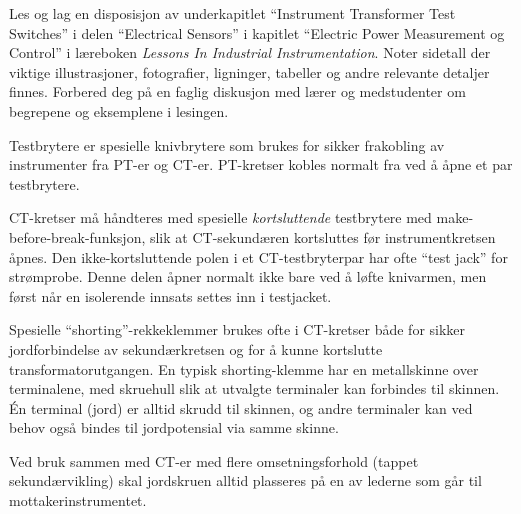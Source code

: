 

Les og lag en disposisjon av underkapitlet ``Instrument Transformer Test Switches'' i delen ``Electrical Sensors'' i kapitlet ``Electric Power Measurement og Control'' i læreboken {\it Lessons In Industrial Instrumentation}. Noter sidetall der viktige illustrasjoner, fotografier, ligninger, tabeller og andre relevante detaljer finnes. Forbered deg på en faglig diskusjon med lærer og medstudenter om begrepene og eksemplene i lesingen.













Testbrytere er spesielle knivbrytere som brukes for sikker frakobling av instrumenter fra PT-er og CT-er. PT-kretser kobles normalt fra ved å åpne et par testbrytere.

\vskip 10pt

CT-kretser må håndteres med spesielle {\it kortsluttende} testbrytere med make-before-break-funksjon, slik at CT-sekundæren kortsluttes før instrumentkretsen åpnes. Den ikke-kortsluttende polen i et CT-testbryterpar har ofte ``test jack'' for strømprobe. Denne delen åpner normalt ikke bare ved å løfte knivarmen, men først når en isolerende innsats settes inn i testjacket.

\vskip 10pt

Spesielle ``shorting''-rekkeklemmer brukes ofte i CT-kretser både for sikker jordforbindelse av sekundærkretsen og for å kunne kortslutte transformatorutgangen. En typisk shorting-klemme har en metallskinne over terminalene, med skruehull slik at utvalgte terminaler kan forbindes til skinnen. Én terminal (jord) er alltid skrudd til skinnen, og andre terminaler kan ved behov også bindes til jordpotensial via samme skinne.

Ved bruk sammen med CT-er med flere omsetningsforhold (tappet sekundærvikling) skal jordskruen alltid plasseres på en av lederne som går til mottakerinstrumentet.








